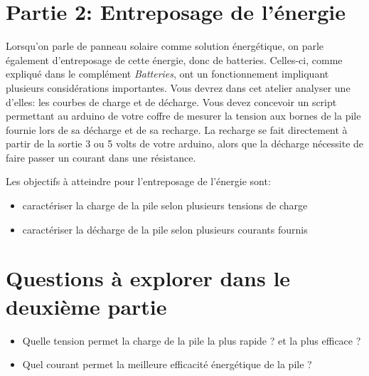 \documentclass[canadien,12pt,oneside,letterpaper]{article}
\begin{document}
\section{Partie 2: Entreposage de l'énergie}\label{sec:partie2}
\vspace{-2ex}
Lorsqu'on parle de panneau solaire comme solution énergétique, on parle également d'entreposage de cette énergie, donc de batteries. Celles-ci, comme expliqué dans le complément \textit{Batteries}, ont un fonctionnement impliquant plusieurs considérations importantes. Vous devrez dans cet atelier analyser une d'elles: les courbes de charge et de décharge. Vous devez concevoir un script permettant au arduino de votre coffre de mesurer la tension aux bornes de la pile fournie lors de sa décharge et de sa recharge. La recharge se fait directement à partir de la sortie 3 ou 5 volts de votre arduino, alors que la décharge nécessite de faire passer un courant dans une résistance.

Les objectifs à atteindre pour l'entreposage de l'énergie sont:
\begin{itemize}
\item caractériser la charge de la pile selon plusieurs tensions de charge
\item caractériser la décharge de la pile selon plusieurs courants fournis 
\end{itemize}

\section{Questions à explorer dans le deuxième partie}
\begin{itemize}
\item Quelle tension permet la charge de la pile la plus rapide ? et la plus efficace ?
\item Quel courant permet la meilleure efficacité énergétique de la pile ?
\end{itemize}
\end{document}
